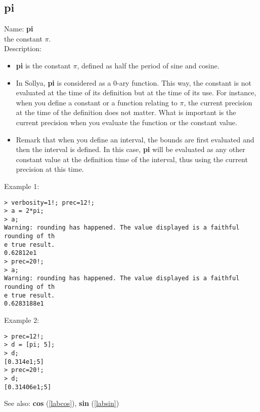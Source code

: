 \subsection{pi}
\label{labpi}
\noindent Name: \textbf{pi}\\
the constant $\pi$.\\

\noindent Description: \begin{itemize}

\item \textbf{pi} is the constant $\pi$, defined as half the period of sine and cosine.

\item In Sollya, \textbf{pi} is considered as a 0-ary function. This way, the constant 
   is not evaluated at the time of its definition but at the time of its use. For 
   instance, when you define a constant or a function relating to $\pi$, the current
   precision at the time of the definition does not matter. What is important is 
   the current precision when you evaluate the function or the constant value.

\item Remark that when you define an interval, the bounds are first evaluated and 
   then the interval is defined. In this case, \textbf{pi} will be evaluated as any 
   other constant value at the definition time of the interval, thus using the 
   current precision at this time.
\end{itemize}
\noindent Example 1: 
\begin{center}\begin{minipage}{15cm}\begin{Verbatim}[frame=single]
> verbosity=1!; prec=12!;
> a = 2*pi;
> a;
Warning: rounding has happened. The value displayed is a faithful rounding of th
e true result.
0.62812e1
> prec=20!;
> a;
Warning: rounding has happened. The value displayed is a faithful rounding of th
e true result.
0.6283188e1
\end{Verbatim}
\end{minipage}\end{center}
\noindent Example 2: 
\begin{center}\begin{minipage}{15cm}\begin{Verbatim}[frame=single]
> prec=12!;
> d = [pi; 5];
> d;
[0.314e1;5]
> prec=20!;
> d;
[0.31406e1;5]
\end{Verbatim}
\end{minipage}\end{center}
See also: \textbf{cos} (\ref{labcos}), \textbf{sin} (\ref{labsin})
